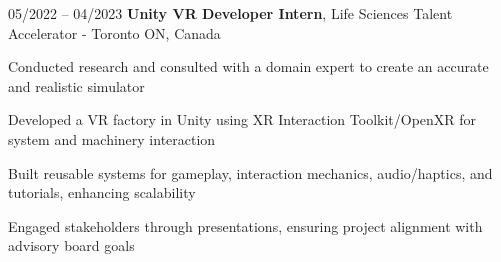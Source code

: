 \begin{twocolentry}{
    05/2022 – 04/2023
}
\fontsize{11 pt}{11 pt}\textbf{Unity VR Developer Intern}, Life Sciences Talent Accelerator - Toronto ON, Canada\end{twocolentry}

\vspace{0.10 cm}
\begin{onecolentry}
    \begin{highlights}
        \item Conducted research and consulted with a domain expert to create an accurate and realistic simulator
        \item Developed a VR factory in Unity using XR Interaction Toolkit/OpenXR for system and machinery interaction
        \item Built reusable systems for gameplay, interaction mechanics, audio/haptics, and tutorials, enhancing scalability
        \item Engaged stakeholders through presentations, ensuring project alignment with advisory board goals
    \end{highlights}
\end{onecolentry}